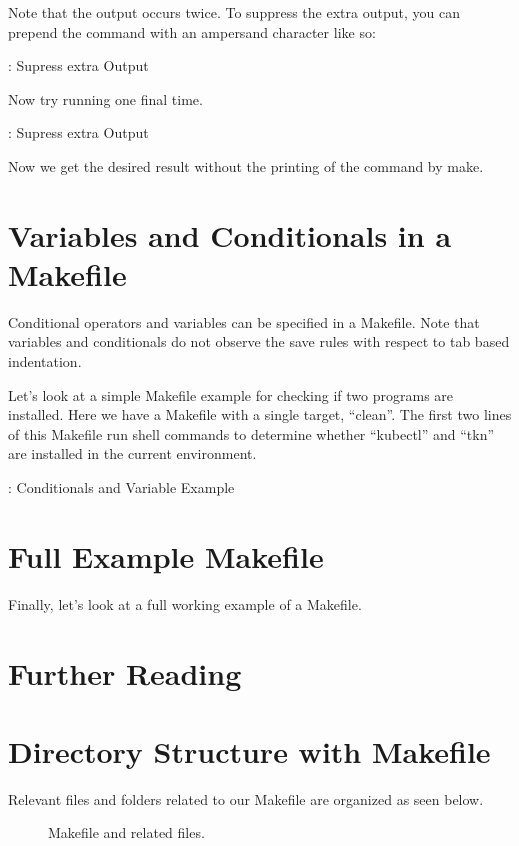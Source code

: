 \justify{}
Note that the output occurs twice. To suppress the extra output, you can prepend the command with an ampersand character like so:

\begin{mybox}{\thetcbcounter: Supress extra Output}
	
\end{mybox}

\justify{}
Now try running one final time.

\begin{mybox}{\thetcbcounter: Supress extra Output}
	
\end{mybox}

\justify{}
Now we get the desired result without the printing of the command
by make.

\section{Variables and Conditionals in a Makefile}

\justify{}
Conditional operators and variables can be specified in a Makefile. Note that variables and conditionals do not observe the save rules with respect to tab based indentation.

\justify{}
Let's look at a simple Makefile example for checking if two programs are installed. Here we have a Makefile
with a single target, ``clean''. The first two lines of this Makefile run shell commands to determine 
whether ``kubectl'' and ``tkn'' are installed in the current environment. 

\begin{mybox}{\thetcbcounter: Conditionals and Variable Example}
	
\end{mybox}

\section{Full Example Makefile}
\justify{}
Finally, let's look at a full working example of a Makefile.

\section{Further Reading}

\section{Directory Structure with Makefile}
\justify{}
Relevant files and folders related to our Makefile are organized as seen
below.

\begin{figure}[!htb]
	
	\caption{Makefile and related files.}
\label{makefile}
\end{figure}

